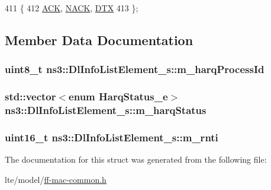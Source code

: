\begin{DoxyCode}
411   \{
412     \hyperlink{structns3_1_1DlInfoListElement__s_a3e55b89f756b7bd8909c8116a202a17aad38ddc6546e38c8a4ca738262e0401a2}{ACK}, \hyperlink{structns3_1_1DlInfoListElement__s_a3e55b89f756b7bd8909c8116a202a17aaf90e76e67c86729b4ee21927b7fb1770}{NACK}, \hyperlink{structns3_1_1DlInfoListElement__s_a3e55b89f756b7bd8909c8116a202a17aa7ddd82eca16b2c3ae367936d486d7777}{DTX}
413   \};
\end{DoxyCode}


\subsection{Member Data Documentation}
\subsubsection[{\texorpdfstring{m\+\_\+harq\+Process\+Id}{m_harqProcessId}}]{\setlength{\rightskip}{0pt plus 5cm}uint8\+\_\+t ns3\+::\+Dl\+Info\+List\+Element\+\_\+s\+::m\+\_\+harq\+Process\+Id}\hypertarget{structns3_1_1DlInfoListElement__s_a08c21d7853e7e1f3b89d6b70d7c496bb}{}\label{structns3_1_1DlInfoListElement__s_a08c21d7853e7e1f3b89d6b70d7c496bb}
\subsubsection[{\texorpdfstring{m\+\_\+harq\+Status}{m_harqStatus}}]{\setlength{\rightskip}{0pt plus 5cm}std\+::vector$<$enum {\bf Harq\+Status\+\_\+e}$>$ ns3\+::\+Dl\+Info\+List\+Element\+\_\+s\+::m\+\_\+harq\+Status}\hypertarget{structns3_1_1DlInfoListElement__s_aceba0535e71de0c4b843bba4cbabd3ad}{}\label{structns3_1_1DlInfoListElement__s_aceba0535e71de0c4b843bba4cbabd3ad}
\subsubsection[{\texorpdfstring{m\+\_\+rnti}{m_rnti}}]{\setlength{\rightskip}{0pt plus 5cm}uint16\+\_\+t ns3\+::\+Dl\+Info\+List\+Element\+\_\+s\+::m\+\_\+rnti}\hypertarget{structns3_1_1DlInfoListElement__s_ae9e2e778e70c32b02fcab4b7a44829f3}{}\label{structns3_1_1DlInfoListElement__s_ae9e2e778e70c32b02fcab4b7a44829f3}


The documentation for this struct was generated from the following file\+:\begin{DoxyCompactItemize}
\item 
lte/model/\hyperlink{ff-mac-common_8h}{ff-\/mac-\/common.\+h}\end{DoxyCompactItemize}
